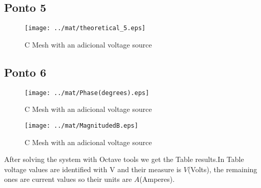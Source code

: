 \subsection{Ponto 5}

\begin{figure}[h] \centering
\texttt{[image: ../mat/theoretical\_5.eps]}
\caption{C Mesh with an adicional voltage source} %
\label{fig:mat4}
\end{figure}


\subsection{Ponto 6}

\begin{figure}[h] \centering
\texttt{[image: ../mat/Phase(degrees).eps]}
\caption{C Mesh with an adicional voltage source} %
\label{fig:mat5db}
\end{figure}

\begin{figure}[h] \centering
\texttt{[image: ../mat/MagnitudedB.eps]}
\caption{C Mesh with an adicional voltage source} %
\label{fig:mat5ps}
\end{figure}



After solving the system with Octave tools we get the Table results.In Table voltage values are identified with V and their measure is $V$(Volts), the remaining ones are current values so their units are $A$(Amperes).





